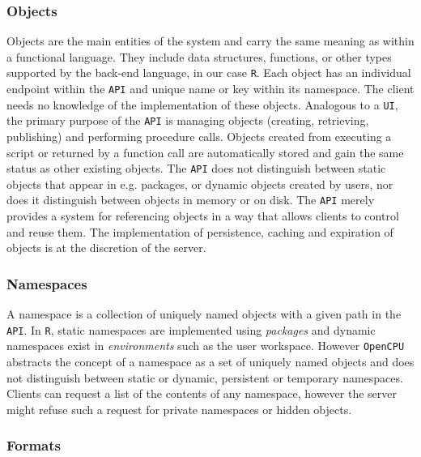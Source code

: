 \documentclass{article}
\newcommand{\R}{\texttt{R}\xspace}
\newcommand{\UI}{\texttt{UI}\xspace}
\newcommand{\API}{\texttt{API}\xspace}
\newcommand{\OpenCPU}{\texttt{OpenCPU}\xspace}
\begin{document}
\subsubsection{Objects}

Objects are the main entities of the system and carry the same meaning as within a functional language. They include data structures, functions, or other types supported by the back-end language, in our case \R. Each object has an individual endpoint within the \API and unique name or key within its namespace. The client needs no knowledge of the implementation of these objects. Analogous to a \UI, the primary purpose of the \API is managing objects (creating, retrieving, publishing) and performing procedure calls. Objects created from executing a script or returned by a function call are automatically stored and gain the same status as other existing objects. The \API does not distinguish between static objects that appear in e.g. packages, or dynamic objects created by users, nor does it distinguish between objects in memory or on disk. The \API merely provides a system for referencing objects in a way that allows clients to control and reuse them. The implementation of persistence, caching and expiration of objects is at the discretion of the server. 

\subsubsection{Namespaces}

A namespace is a collection of uniquely named objects with a given path in the \API. In \R, static namespaces are implemented using \emph{packages} and dynamic namespaces exist in \emph{environments} such as the user workspace. However \OpenCPU abstracts the concept of a namespace as a set of uniquely named objects and does not distinguish between static or dynamic, persistent or temporary namespaces. Clients can request a list of the contents of any namespace, however the server might refuse such a request for private namespaces or hidden objects. 

\subsubsection{Formats}
\end{document}
